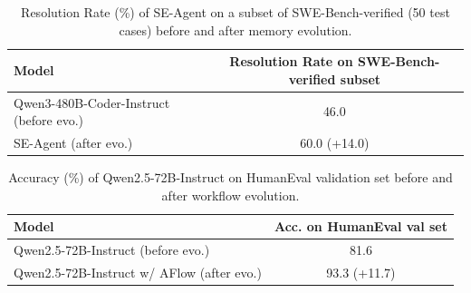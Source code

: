 \documentclass{article} %
\begin{document}
{\begin{table}[H]
    \centering
    \small
    \caption{Resolution Rate (\%) of SE-Agent on a subset of SWE-Bench-verified (50 test cases) before and after memory evolution.}
    \begin{tabular}{lc}
        \toprule
        Model & Resolution Rate on SWE-Bench-verified subset \\
        \midrule
        Qwen3-480B-Coder-Instruct (before evo.) & 46.0 \\
        SE-Agent (after evo.) & 60.0 (+14.0) \\
        \bottomrule
    \end{tabular}
\end{table}

\begin{table}[H]
    \centering
    \small
    \caption{Accuracy (\%) of Qwen2.5-72B-Instruct on HumanEval validation set before and after workflow evolution.}
    \begin{tabular}{lc}
        \toprule
        Model & Acc. on HumanEval val set \\
        \midrule
        Qwen2.5-72B-Instruct (before evo.) & 81.6 \\
        Qwen2.5-72B-Instruct w/ AFlow (after evo.) & 93.3 (+11.7) \\
        \bottomrule
    \end{tabular}
\end{table}
}
\end{document}
